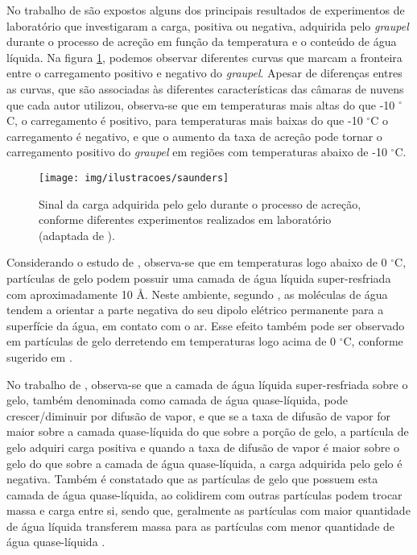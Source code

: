 No trabalho de  são expostos alguns dos principais resultados de experimentos de laboratório que investigaram a carga, positiva ou negativa, adquirida pelo \textit{graupel} durante o processo de acreção em função da temperatura e o conteúdo de água líquida. Na figura  \ref{fig:saunders}, podemos observar diferentes curvas que marcam a fronteira entre o carregamento positivo e negativo do \textit{graupel}. Apesar de diferenças entres as curvas, que são associadas às diferentes características das câmaras de nuvens que cada autor utilizou, observa-se que em temperaturas mais altas do que -10 $^{\circ}$C, o carregamento é positivo, para temperaturas mais baixas do que -10 $^{\circ}$C o carregamento é negativo, e que o aumento da taxa de acreção pode tornar o carregamento positivo do \textit{graupel} em regiões com temperaturas abaixo de -10 $^{\circ}$C.

 


\begin{figure}[htp]
\centering 
\texttt{[image: img/ilustracoes/saunders]}
\caption{Sinal da carga adquirida pelo gelo durante o processo de acreção, conforme diferentes experimentos realizados em laboratório (adaptada de ).}
\label{fig:saunders}
\end{figure}

Considerando o estudo de , observa-se que em temperaturas logo abaixo de 0 $^{\circ}$C, partículas de gelo podem possuir uma camada de água líquida super-resfriada com aproximadamente 10 {\AA}. Neste ambiente, segundo , as moléculas de água tendem a orientar a parte negativa do seu dipolo elétrico permanente para a superfície da água, em contato com o ar. Esse efeito também pode ser observado em partículas de gelo derretendo em temperaturas logo acima de 0 $^{\circ}$C, conforme sugerido em .

No trabalho de , observa-se que a camada de água líquida super-resfriada sobre o gelo, também denominada como camada de água quase-líquida, pode crescer/diminuir por difusão de vapor, e que se a taxa de difusão de vapor for maior sobre a camada quase-líquida do que sobre a porção de gelo, a partícula de gelo adquiri carga positiva e quando a taxa de difusão de vapor é maior sobre o gelo do que sobre a camada de água quase-líquida, a carga adquirida pelo gelo é negativa. Também é constatado que as partículas de gelo que possuem esta camada de água quase-líquida, ao colidirem com outras partículas podem trocar massa e carga entre si, sendo que, geralmente as partículas com maior quantidade de água líquida transferem massa para as partículas com menor quantidade de água quase-líquida \cite{baker1994}. 


